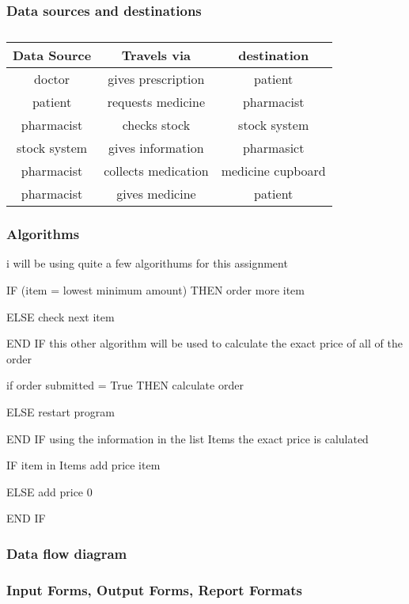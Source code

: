 \subsubsection{Data sources and destinations}
\begin{table}[t]
\begin{tabular}{|c|c|c|}
\hline
Data Source & Travels via & destination\\
\hline
doctor & gives prescription & patient\\
\hline
patient & requests medicine & pharmacist\\
\hline
pharmacist & checks stock & stock system\\
\hline 
stock system & gives information & pharmasict\\
\hline
pharmacist & collects medication & medicine cupboard\\
\hline
pharmacist & gives medicine & patient
\hline
\end{tabular}
\caption{}
\label{tab:}
\end{table}
\subsubsection{Algorithms}

i will be using quite a few algorithums for this assignment

IF (item = lowest minimum amount) THEN
		order more item

ELSE
		check next item

END IF
\space
this other algorithm will be used to calculate the exact price of all of the order 

if order submitted = True THEN
		calculate order

ELSE 
		restart program

END IF
\space
using the information in the list Items the exact price is calulated

IF item in Items
		add price item

ELSE
		add price 0

END IF

\subsubsection{Data flow diagram}
\subsubsection{Input Forms, Output Forms, Report Formats}


